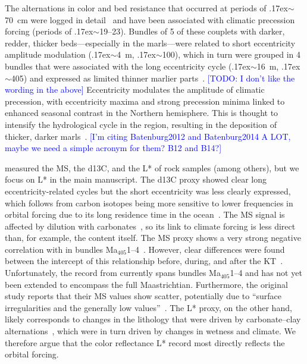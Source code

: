 \documentclass[draft]{agujournal2019}
\newcommand{\appr}{\raise.17ex\hbox{\(\scriptstyle\sim\)}} %
\newcommand{\ma}[1]{Ma\(_{405}\)#1} %
\newcommand{\ijk}{\textcolor{blue}}
\begin{document}
The alternations in color and bed resistance that occurred at periods of \appr\qty{70}{\cm} were logged in detail~\cite{Batenburg2012,Dinares-Turell2013}
and have been associated with climatic precession forcing (periods of \appr\qtyrange{19}{23}{\kiloyear}).
Bundles of 5 of these couplets with darker, redder, thicker beds---especially in the marls---were related to short eccentricity amplitude modulation (\appr\qty{4}{\metre}, \appr\qty{100}{\kiloyear}),
which in turn were grouped in 4 bundles that were associated with the long eccentricity cycle (\appr\qty{16}{\metre}, \appr\qty{405}{\kiloyear}) and expressed as limited thinner marlier parts~\cite{Batenburg2012,Batenburg2014}.
\ijk{[TODO: I don't like the wording in the above]}
Eccentricity modulates the amplitude of climatic precession,
with eccentricity maxima and strong precession minima linked to enhanced seasonal contrast in the Northern hemisphere.
This is thought to intensify the hydrological cycle in the region, resulting in the deposition of thicker, darker marls~\cite{Batenburg2014}.
\ijk{[I'm citing Batenburg2012 and Batenburg2014 A LOT, maybe we need a simple acronym for them? B12 and B14?]}

 measured the \gls{MS}, the \gls{d13C}, and the \gls{L*} of rock samples (among others), but we focus on \gls{L*} in the main manuscript.
The \gls{d13C} proxy showed clear long eccentricity-related cycles but the short eccentricity was less clearly expressed,
which follows from carbon isotopes being more sensitive to lower frequencies in orbital forcing due to its long residence time in the ocean~\cite{Zeebe2017,Kocken2019loscar}.
The \gls{MS} signal is affected by dilution with carbonates~\cite{tenKateSprenger1993},
so its link to climate forcing is less direct than, for example, the  content itself.
The \gls{MS} proxy shows a very strong negative correlation with  in bundles \ma{1--4}~\cite{tenKateSprenger1993,Gilabert2022}.
However, clear differences were found between the intercept of this relationship before, during, and after the \gls{KT}~\cite<supplementary figure S2 in>{Gilaberg2022}.
Unfortunately, the  record from  currently spans bundles \ma{1--4} and has not yet been extended to encompass the full Maastrichtian.
Furthermore, the original study reports that their \gls{MS} values show scatter, potentially due to ``surface irregularities and the generally low values''~\cite{Batenburg2012}.
The \gls{L*} proxy, on the other hand, likely corresponds to changes in the lithology that were driven by carbonate--clay alternations~\cite{MountWard1986,Batenburg2012},
which were in turn driven by changes in wetness and climate.
We therefore argue that the color reflectance \gls{L*} record most directly reflects the orbital forcing.
\end{document}
